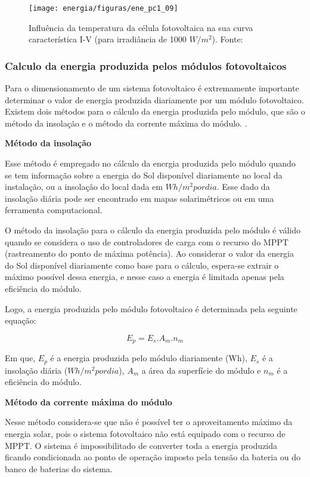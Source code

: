 		
\begin{figure}[H]
		\centering
		\texttt{[image: energia/figuras/ene\_pc1\_09]}
		\caption{ Influência da temperatura da célula fotovoltaica na sua curva característica I-V (para irradiância de 1000 $W/m^2$). Fonte: \cite{Cresesb}}
		\label{ene_pc1_09}
	\end{figure}

\subsubsection{Calculo da energia produzida pelos módulos fotovoltaicos} 

	Para o dimensionamento de um sistema fotovoltaico é extremamente importante determinar o valor de energia produzida diariamente por um módulo fotovoltaico. Existem dois métodos para o cálculo da energia produzida pelo módulo, que são o método da insolação e o método da corrente máxima do módulo. \cite{Villalva}.
	
	\textbf{Método da insolação}
	
	Esse método é empregado no cálculo da energia produzida pelo módulo quando se tem informação sobre a energia do Sol disponível diariamente no local da instalação, ou a insolação do local dada em $Wh/m^2 por dia$. Esse dado da insolação diária pode ser encontrado em mapas solarimétricos ou em uma ferramenta computacional.  
	
	O método da insolação para o cálculo da energia produzida pelo módulo é válido quando se considera o uso de controladores de carga com o recurso do MPPT (rastreamento do ponto de máxima potência). Ao considerar o valor da energia do Sol disponível diariamente como base para o cálculo, espera-se extrair o máximo possível dessa energia, e nesse caso a energia é limitada apenas pela eficiência do módulo. \cite{Villalva}
	
	Logo, a energia produzida pelo módulo fotovoltaico é determinada pela seguinte equação:
	
	\begin{equation}
	E_p = E_s . A_m . n_m
	\end{equation}
	
	Em que, $E_p$ é a energia produzida pelo módulo diariamente (Wh), $E_s$ é a insolação diária ($Wh/m^2 por dia$), $A_m$ a área da superfície do módulo e $n_m$ é a eficiência do módulo.
	
	\textbf{Método da corrente máxima do módulo}
	
	Nesse método considera-se que não é possível ter o aproveitamento máximo da energia solar, pois o sistema fotovoltaico não está equipado com o recurso de MPPT. O sistema é impossibilitado de converter toda a energia produzida ficando condicionada ao ponto de operação imposto pela tensão da bateria ou do banco de baterias do sistema.\cite{Villalva}
	
